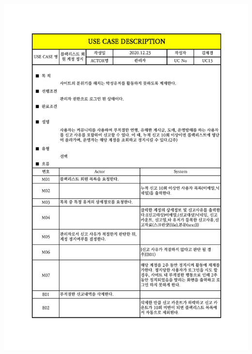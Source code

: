 {{{{{{{{{{{{{{\includegraphics[width=1.1\textwidth]{./Figure/Design/Display/usecase/013.pdf} \\
}}}}}}}}}}}}}}
